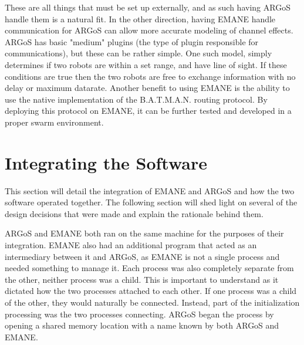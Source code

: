 These are all things that must be set up externally, and as such having ARGoS handle them is a natural fit.
In the other direction, having EMANE handle communication for ARGoS can allow more accurate modeling of channel effects.
ARGoS has basic "medium" plugins (the type of plugin responsible for communications), but these can be rather simple.
One such model, simply determines if two robots are within a set range, and have line of sight.
If these conditions are true then the two robots are free to exchange information with no delay or maximum datarate.
Another benefit to using EMANE is the ability to use the native implementation of the B.A.T.M.A.N. routing protocol.
By deploying this protocol on EMANE, it can be further tested and developed in a proper swarm environment.

\section{Integrating the Software}
This section will detail the integration of EMANE and ARGoS and how the two software operated together.
The following section will shed light on several of the design decisions that were made and explain the rationale behind them.\par
ARGoS and EMANE both ran on the same machine for the purposes of their integration.
EMANE also had an additional program that acted as an intermediary between it and ARGoS, as EMANE is not a single process and needed something to manage it.
Each process was also completely separate from the other, neither process was a child.
This is important to understand as it dictated how the two processes attached to each other.
If one process was a child of the other, they would naturally be connected. Instead, part of the initialization processing was the two processes connecting.
ARGoS began the process by opening a shared memory location with a name known by both ARGoS and EMANE.
